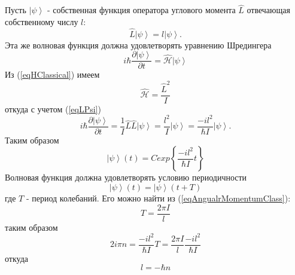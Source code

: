 Пусть $\left|\psi\right>$ - собственная функция оператора углового
момента $\hat{L}$ отвечающая собственному числу $l$:
\begin{equation}
\hat{L} \left|\psi\right> = l \left|\psi\right>.
\label{eqLPsi}
\end{equation}
Эта же волновая функция должна удовлетворять уравнению Шредингера
\[
i \hbar \frac{\partial \left|\psi\right>}{ \partial t} = 
\hat { \mathcal{H} } \left|\psi\right>
\]
Из (\ref{eqHClassical}) имеем
\[
\hat { \mathcal{H} } = \frac{\hat{L}^2}{I}
\]
откуда с учетом (\ref{eqLPsi})
\[
i \hbar \frac{\partial \left|\psi\right>}{ \partial t} = 
\frac{1}{I} \hat{L} \hat{L} \left|\psi\right> = 
\frac{l^2}{I} \left|\psi\right> = 
\frac{-i l^2}{\hbar I} \left|\psi\right>.
\]
Таким образом
\[
\left|\psi\right>\left(t \right) = C \dot exp\left\{\frac{-i l^2}{\hbar
    I} t
\right\}
\]
Волновая функция должна удовлетворять условию периодичности
\[
\left|\psi\right>\left(t \right) = \left|\psi\right>\left(t + T \right)
\]
где $T$ - период колебаний. Его можно найти из
(\ref{eqAngualrMomentumClass}):
\[
T = \frac{2 \pi I}{l}
\]
таким образом
\[
2 i \pi n = \frac{-i l^2}{\hbar I} T = 
\frac{2 \pi I}{l} \frac{-i l^2}{\hbar I}
\]
откуда
\[
l = -\hbar n
\]


